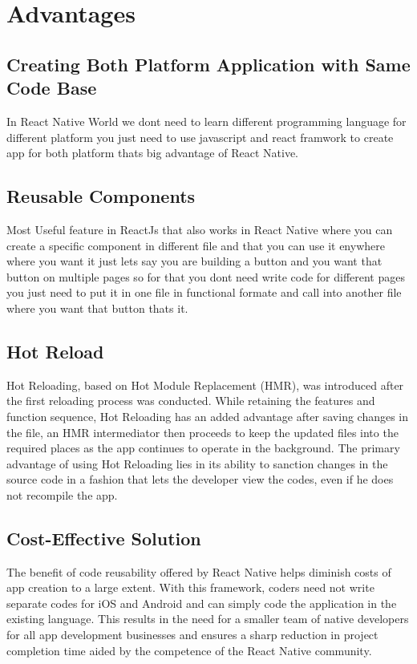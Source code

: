 \documentclass[12pt,a4paper]{report}
\begin{document}
\newpage

\section{Advantages}

\subsection{Creating Both Platform Application with Same Code Base}
In React Native World we dont need to learn different programming language for different platform you just need to use javascript and react framwork to create app for both platform thats big advantage of React Native.

\subsection{Reusable Components}
Most Useful feature in ReactJs that also works in React Native where you can create a specific component in different file and that you can use it enywhere where you want  it just lets say you are building a button and you want that button on multiple pages so for that you dont need write code for different pages you just need to put it in one file in functional formate and call into another file where you want that button thats it.


\subsection{ Hot Reload }
Hot Reloading, based on Hot Module Replacement (HMR), was introduced after the first reloading process was conducted. While retaining the features and function sequence, Hot Reloading has an added advantage after saving changes in the file, an HMR intermediator then proceeds to keep the updated files into the required places as the app continues to operate in the background. The primary advantage of using Hot Reloading lies in its ability to sanction changes in the source code in a fashion that lets the developer view the codes, even if he does not recompile the app.

\subsection{Cost-Effective Solution}
The benefit of code reusability offered by React Native helps diminish costs of app creation to a large extent. With this framework, coders need not write separate codes for iOS and Android and can simply code the application in the existing language. This results in the need for a smaller team of native developers for all app development businesses and ensures a sharp reduction in project completion time aided by the competence of the React Native community.
\end{document}
